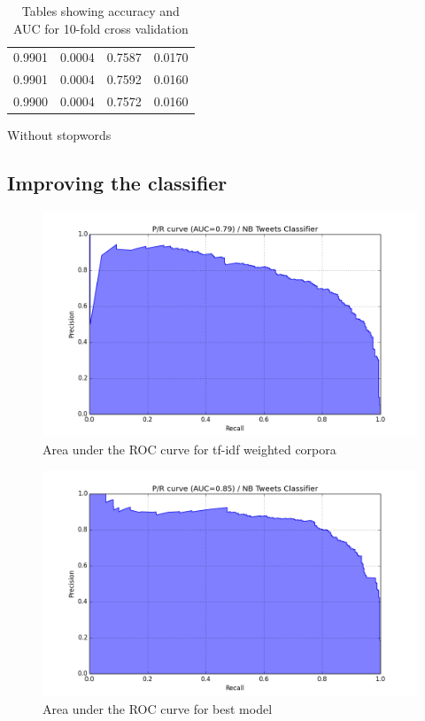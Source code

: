 \begin{table}
\begin{subtable}{.5\linewidth}
\begin{tabular}{cccc}
      0.9901          & 0.0004        & 0.7587          & 0.0170 \\
      0.9901          & 0.0004        & 0.7592          & 0.0160 \\
      0.9900          & 0.0004        & 0.7572          & 0.0160 \\ \bottomrule
    \end{tabular}
      \caption{Without stopwords}
      \label{tab:data_without_stopwords}
  \end{subtable}
\caption{Tables showing accuracy and AUC for 10-fold cross validation}
\label{tab:all_data_tables}
\end{table}



\subsection{Improving the classifier}
\begin{figure}
\begin{center}
    \includegraphics[scale=0.6]{figures/pr_NB_Tweets_Classifier_03}
\end{center}
\caption{Area under the ROC curve for tf-idf weighted corpora}
\label{fig:auc_tfidf}
\end{figure}


\begin{figure}
\begin{center}
    \includegraphics[scale=0.6]{figures/pr_NB_Tweets_Classifier_04}
\end{center}
\caption{Area under the ROC curve for best model}
\label{fig:auc_best_model}
\end{figure}
